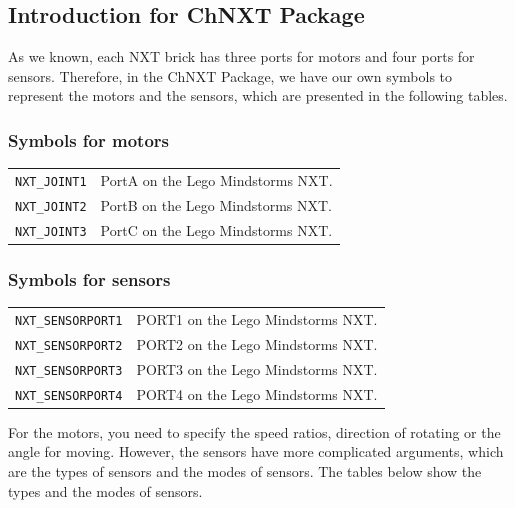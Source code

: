 \documentclass[11pt]{article}
\begin{document}
\subsection{\label{sec:basic_intro}Introduction for ChNXT Package}
As we known, each NXT brick has three ports for motors and four ports for sensors.
Therefore, in the ChNXT Package, we have our own symbols to represent the motors
and the sensors, which are presented in the following tables.

\subsubsection*{Symbols for motors}
\begin{longtable}{p{3.5cm}p{12cm}}
\hline 
{\tt NXT\_JOINT1} & PortA on the Lego Mindstorms NXT. \\
{\tt NXT\_JOINT2} & PortB on the Lego Mindstorms NXT. \\
{\tt NXT\_JOINT3} & PortC on the Lego Mindstorms NXT. \\
\hline
\end{longtable}

\newpage
\subsubsection*{Symbols for sensors}
\begin{longtable}{p{3.5cm}p{12cm}}
\hline
{\tt NXT\_SENSORPORT1}&PORT1 on the Lego Mindstorms NXT.\\
{\tt NXT\_SENSORPORT2}&PORT2 on the Lego Mindstorms NXT.\\
{\tt NXT\_SENSORPORT3}&PORT3 on the Lego Mindstorms NXT.\\
{\tt NXT\_SENSORPORT4}&PORT4 on the Lego Mindstorms NXT.\\
\hline
\end{longtable}
For the motors, you need to specify the speed ratios, direction of rotating or the
angle for moving. However, the sensors have more complicated arguments, which are
the types of sensors and the modes of sensors. The tables below show the types and
the modes of sensors.
\end{document}
